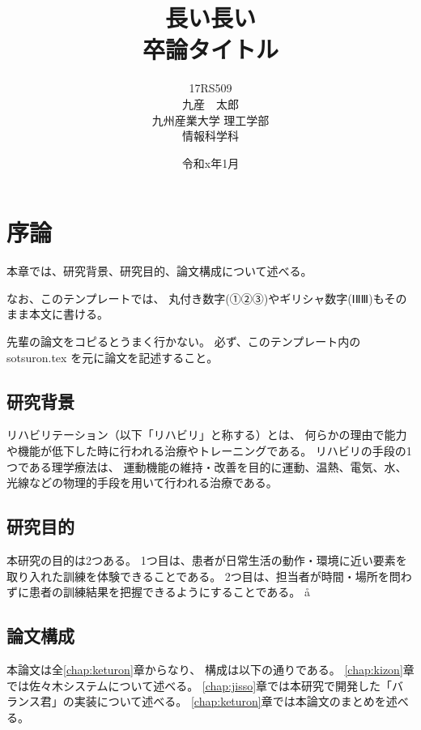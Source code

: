 \documentclass[uplatex,a4paper,12pt]{jsreport}
\title{
 \Huge{長い長い}\\
 \Huge{卒論タイトル}
 \vspace{3.5cm}\\
}
\author{\LARGE{17RS509}\vspace{0.5cm}\\
\LARGE{九産　太郎}\vspace{2cm}\\
\LARGE{九州産業大学 理工学部}\vspace{0.5cm}\\
\LARGE{情報科学科}\vspace{1cm}\\
}
\date{\LARGE{令和x年1月}}
\begin{document}
\maketitle
\setcounter{page}{0}
\tableofcontents
\listoffigures
\listoftables
\clearpage
\setcounter{page}{0}


\chapter{序論}\label{chap:joron}
本章では、研究背景、研究目的、論文構成について述べる。

なお、このテンプレートでは、
丸付き数字(①②③)やギリシャ数字(ⅠⅡⅢ)もそのまま本文に書ける。

先輩の論文をコピるとうまく行かない。
必ず、このテンプレート内の sotsuron.tex を元に論文を記述すること。

\section{研究背景}\label{sec:haikei}

リハビリテーション（以下「リハビリ」と称する）とは、
何らかの理由で能力や機能が低下した時に行われる治療やトレーニングである。
リハビリの手段の1つである理学療法は、
運動機能の維持・改善を目的に運動、温熱、電気、水、
光線などの物理的手段を用いて行われる治療である\cite{igaku}。%

  
    
\section{研究目的}\label{sec:mokuteki}

本研究の目的は2つある。
1つ目は、患者が日常生活の動作・環境に近い要素を取り入れた訓練を体験できることである。
2つ目は、担当者が時間・場所を問わずに患者の訓練結果を把握できるようにすることである。
å
  
\section{論文構成}\label{sec:kousei}

本論文は全\ref{chap:keturon}章からなり、
構成は以下の通りである。
\ref{chap:kizon}章では佐々木システムについて述べる。
\ref{chap:jisso}章では本研究で開発した「バランス君」の実装について述べる。
\ref{chap:keturon}章では本論文のまとめを述べる。
\end{document}
